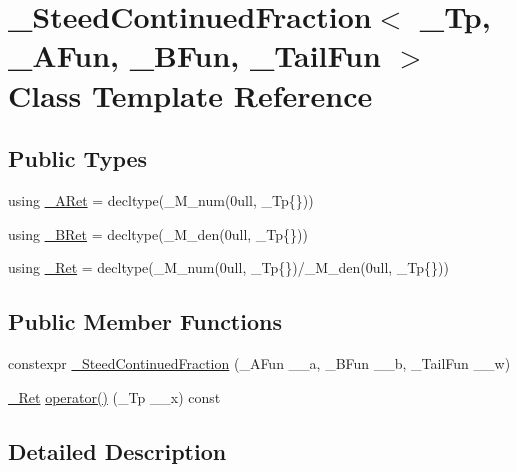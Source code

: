 \hypertarget{class__SteedContinuedFraction}{}\section{\+\_\+\+Steed\+Continued\+Fraction$<$ \+\_\+\+Tp, \+\_\+\+A\+Fun, \+\_\+\+B\+Fun, \+\_\+\+Tail\+Fun $>$ Class Template Reference}
\label{class__SteedContinuedFraction}
\subsection*{Public Types}
\begin{DoxyCompactItemize}
\item 
using \hyperlink{class__SteedContinuedFraction_a52fc9abde4ea881c7b1cea53bd0e72ee}{\+\_\+\+A\+Ret} = decltype(\+\_\+\+M\+\_\+num(0ull, \+\_\+\+Tp\{\}))
\item 
using \hyperlink{class__SteedContinuedFraction_ab5af06efbdaf40ddcdfdd36a0872854e}{\+\_\+\+B\+Ret} = decltype(\+\_\+\+M\+\_\+den(0ull, \+\_\+\+Tp\{\}))
\item 
using \hyperlink{class__SteedContinuedFraction_a9dc0b4a835f6e3c7495889da047a3706}{\+\_\+\+Ret} = decltype(\+\_\+\+M\+\_\+num(0ull, \+\_\+\+Tp\{\})/\+\_\+\+M\+\_\+den(0ull, \+\_\+\+Tp\{\}))
\end{DoxyCompactItemize}
\subsection*{Public Member Functions}
\begin{DoxyCompactItemize}
\item 
constexpr \hyperlink{class__SteedContinuedFraction_a4878a856bbc09caaea8fd4cf287d06c5}{\+\_\+\+Steed\+Continued\+Fraction} (\+\_\+\+A\+Fun \+\_\+\+\_\+a, \+\_\+\+B\+Fun \+\_\+\+\_\+b, \+\_\+\+Tail\+Fun \+\_\+\+\_\+w)
\item 
\hyperlink{class__SteedContinuedFraction_a9dc0b4a835f6e3c7495889da047a3706}{\+\_\+\+Ret} \hyperlink{class__SteedContinuedFraction_aa435e7908e7a2bbef90ef9f8aad464aa}{operator()} (\+\_\+\+Tp \+\_\+\+\_\+x) const
\end{DoxyCompactItemize}


\subsection{Detailed Description}
